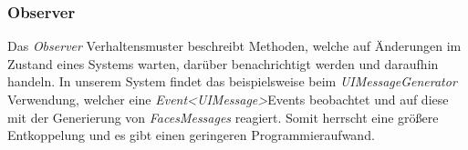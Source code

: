 \subsubsection{Observer}
Das \emph{Observer} Verhaltensmuster beschreibt Methoden, welche auf
Änderungen im Zustand eines Systems warten, darüber benachrichtigt werden und daraufhin handeln.
In unserem System findet das beispielsweise beim \emph{UIMessageGenerator} %
Verwendung, welcher eine \emph{Event<UIMessage>}\-Events beobachtet und auf diese mit
der Generierung von \emph{FacesMessages} reagiert.
Somit herrscht eine größere Entkoppelung und es gibt einen geringeren Programmieraufwand.